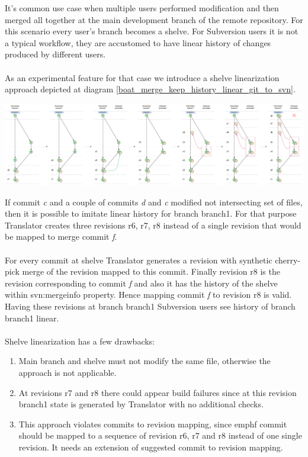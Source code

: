 It's common use case when multiple users performed modification and then merged all together at the main development branch of the remote repository. For this scenario every user's branch becomes a shelve. For Subversion users it is not a typical workflow, they are accustomed to have linear history of changes produced by different users.
\\\\
As an experimental feature for that case we introduce a shelve linearization approach depicted at diagram \ref{boat_merge_keep_history_linear_git_to_svn}.
\begin{center}
\includegraphics[width=\textwidth]{img/diagrams/boat_merge_keep_history_linear_git_to_svn.pdf}%
\label{boat_merge_keep_history_linear_git_to_svn}%
\end{center}

If commit \emph{c} and a couple of commits \emph{d} and \emph{c} modified not intersecting set of files, then it is possible to imitate linear history for branch branch1. For that purpose Translator creates three revisions r6, r7, r8 instead of a single revision that would be mapped to merge commit \emph{f}.
\\\\
For every commit at shelve Translator generates a revision with synthetic cherry-pick merge of the revision mapped to this commit. Finally revision r8 is the revision corresponding to commit \emph{f} and also it has the history of the shelve within svn:mergeinfo property. Hence mapping commit \emph{f} to revision r8 is valid. Having these revisions at branch branch1 Subversion users see history of branch branch1 linear.
\\\\
Shelve linearization has a few drawbacks:
\begin{enumerate}
\compactlist
	\item Main branch and shelve must not modify the same file, otherwise the approach is not applicable.
	\item At revisions r7 and r8 there could appear build failures since at this revision branch1 state is generated by Translator with no additional checks.
	\item This approach violates commits to revision mapping, since emph{f} commit should be mapped to a sequence of revision r6, r7 and r8 instead of one single revision. It needs an extension of suggested commit to revision mapping.
\end{enumerate}

